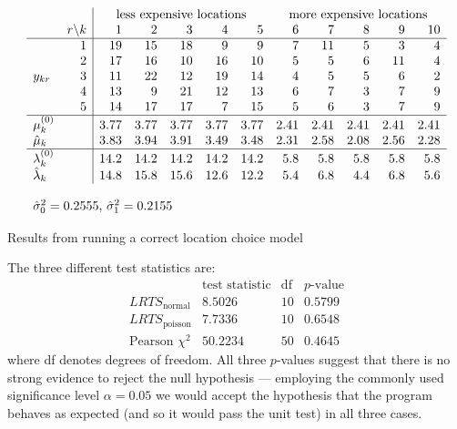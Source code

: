 \documentclass{sig-alternate-preprint}
\begin{document}
\begin{table}[t]
\[
\begin{array}{lr|rrrrrrrrrr}
&& \multicolumn{5}{c}{\text{less expensive locations}} & \multicolumn{5}{c}{\text{more expensive
      locations}} \\
& r \backslash k& 1 & 2 & 3 & 4 & 5 & 6 & 7 & 8 & 9 & 10 \\\hline
& 1 & 19& 15& 18&  9 & 9 & 7 & 11 & 5 & 3 & 4 \\
& 2 & 17 &16 &10 &16 &10 & 5 & 5 & 6 &11 & 4 \\
y_{kr} & 3 & 11 & 22& 12& 19& 14 & 4 & 5 & 5 & 6 & 2 \\
& 4 & 13 & 9 &21 &12 &13 & 6 & 7 & 3 & 7 & 9 \\
& 5 & 14 &17 &17 & 7 &15 & 5 & 6 & 3 & 7 & 9 \\\hline
\mu_{k}^{(0)} & & 3.77 & 3.77 & 3.77 & 3.77 & 3.77 & 2.41 & 2.41 &2.41
      &2.41 & 2.41\\
\hat{\mu}_{k} & & 3.83 &   3.94 &  3.91 &  3.49 &  3.48 &
  2.31 &  2.58 &  2.08 &  2.56 &  2.28 \\\hline
\lambda_{k}^{(0)} & & 14.2  & 14.2 & 14.2 & 14.2 & 14.2
& 5.8 &  5.8 &  5.8 &  5.8 &  5.8\\
\hat{\lambda}_{k} & & 14.8 &  15.8 &  15.6 &  12.6 &  12.2 &
   5.4 &    6.8 &   4.4 &    6.8 &   5.6 \\
\\
\multicolumn{12}{l}{\hat{\sigma}_0^2=0.2555$, $\hat{\sigma}_1^2=0.2155}
\end{array}
\]

\caption{Results from running a correct location choice model}
\label{good-results-table}
\end{table}

The three different test statistics are:
\[
\begin{array}{l|rrr}
& \text{test statistic} &\text{df} & p\text{-value} \\\hline
LRTS_{\text{normal}} & 8.5026 & 10 & 0.5799 \\
LRTS_{\text{poisson}} & 7.7336 & 10 & 0.6548 \\
\text{Pearson } \chi^2 & 50.2234 & 50 & 0.4645
\end{array}
\]
where df denotes degrees of freedom.  All three $p$-values suggest that there
is no strong evidence to reject the null hypothesis --- employing the commonly
used significance level $\alpha=0.05$ we would accept the hypothesis that the
program behaves as expected (and so it would pass the unit test) in all three cases.
\end{document}
